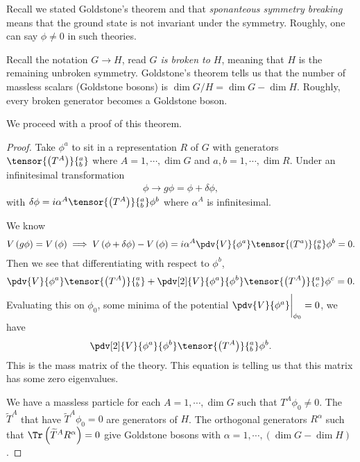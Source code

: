 
Recall we stated Goldstone's theorem and that \emph{sponanteous symmetry breaking} means that the ground state is not invariant under the symmetry. Roughly, one can say $\phi \neq 0$ in such theories. 

Recall the notation $G \to H$, read \emph{$G$ is broken to $H$}, meaning that $H$ is the remaining unbroken symmetry. Goldstone's theorem tells us that the number of massless scalars (Goldstone bosons) is $\dim G / H = \dim G - \dim H$. Roughly, every broken generator becomes a Goldstone boson.

We proceed with a proof of this theorem.

\begin{proof}
    Take $\phi^{a}$ to sit in a representation $R$ of $G$ with generators $\tensor{\left( T^{A} \right)}{^{a}_b}$ where $A = 1 ,\cdots, \dim G$ and $a,b = 1, \cdots, \dim R$. Under an infinitesimal transformation
    \begin{align}
        \phi \to g \phi = \phi + \delta \phi
    ,\end{align}
    with $\delta \phi = i \alpha^{A} \tensor{\left( T^{A} \right)}{^{a}_b} \phi^{b}$ where $\alpha^{A}$ is infinitesimal.

    We know
    \begin{align}
        V \left( g \phi \right) = V \left( \phi \right) \implies V \left( \phi + \delta \phi \right) - V \left( \phi \right) = i\alpha^{A} \pdv{V}{\phi^{a}} \tensor{\left( T^{a} \right)}{^{a}_b} \phi^{b} = 0
    .\end{align}
    Then we see that differentiating with respect to $\phi^{b}$, 
    \begin{align}
        \pdv{V}{\phi^{a}} \tensor{\left( T^{A} \right)}{^{a}_b} + \pdv[2]{V}{\phi^{a}}{\phi^{b}} \tensor{\left( T^{A} \right)}{^{a}_c} \phi^{c} = 0
    .\end{align}
    Evaluating this on $\phi_0$, some minima of the potential $\pdv{V}{\phi^{a}}\bigg|_{\phi_0} = 0$, we have
    \begin{align}
        \pdv[2]{V}{\phi^{a}}{\phi^{b}} \tensor{\left( T^{A} \right)}{^{a}_b} \phi^{b}
    .\end{align}
    This is the mass matrix of the theory. This equation is telling us that this matrix has some zero eigenvalues.

    We have a massless particle for each $A = 1, \cdots, \dim G$ such that $T^{A} \phi_0 \neq 0$. The $\widetilde{T}^{A}$ that have $\widetilde{T}^{A} \phi_0 = 0$ are generators of $H$. The orthogonal generators $R^{\alpha}$ such that $\Tr \left( \widetilde{T}^{A} R^{\alpha} \right) = 0$ give Goldstone bosons with $\alpha = 1, \cdots, \left( \dim G - \dim H \right) $.
\end{proof}


